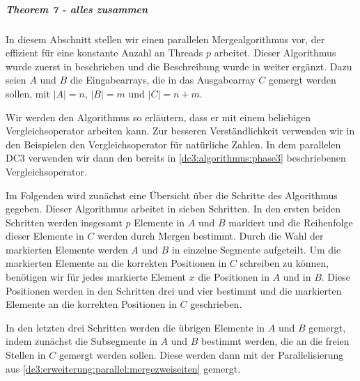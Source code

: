 \subparagraph*{Theorem 7 - alles zusammen}

In diesem Abschnitt stellen wir einen parallelen Mergealgorithmus vor, der effizient für eine konstante Anzahl an Threads $p$ arbeitet. Dieser Algorithmus wurde zuerst in \cite{merge:valiant} beschrieben und die Beschreibung wurde in \cite{merge:kruskal} weiter ergänzt. Dazu seien $A$ und $B$ die Eingabearrays, die in das Ausgabearray $C$ gemergt werden sollen, mit $|A|=n$, $|B|=m$ und $|C|=n+m$. \par
Wir werden den Algorithmus so erläutern, dass er mit einem beliebigen Vergleichsoperator arbeiten kann. Zur besseren Verständlichkeit verwenden wir in den Beispielen den Vergleichsoperator für natürliche Zahlen. In dem parallelen DC3 verwenden wir dann den bereits in \cref{dc3:algorithmus:phase3} beschriebenen Vergleichsoperator. 

Im Folgenden wird zunächst eine Übersicht über die Schritte des Algorithmus gegeben. Dieser Algorithmus arbeitet in sieben Schritten. In den ersten beiden Schritten werden insgesamt $p$ Elemente in $A$ und $B$ markiert und die Reihenfolge dieser Elemente in $C$ werden durch Mergen bestimmt. Durch die Wahl der markierten Elemente werden $A$ und $B$ in einzelne Segmente aufgeteilt. Um die markierten Elemente an die korrekten Positionen in $C$ schreiben zu können, benötigen wir für jedes markierte Element $x$ die Positionen in $A$ und in $B$. Diese Positionen werden in den Schritten drei und vier bestimmt und die markierten Elemente an die korrekten Positionen in $C$ geschrieben. \par
In den letzten drei Schritten werden die übrigen Elemente in $A$ und $B$ gemergt, indem zunächst die Subsegmente in $A$ und $B$ bestimmt werden, die an die freien Stellen in $C$ gemergt werden sollen. Diese werden dann mit der Parallelisierung aus \cref{dc3:erweiterung:parallel:mergezweiseiten} gemergt.

